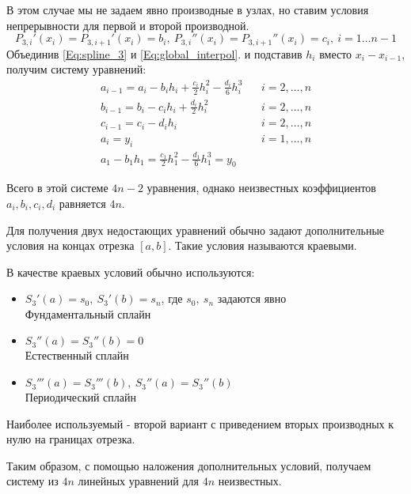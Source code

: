 
В этом случае мы не задаем явно производные в узлах, но ставим условия непрерывности для первой и второй производной.
\begin{equation}
    P_{3,i}' (x_i)=P_{3,i+1}' (x_i) = b_i,\  P_{3,i}'' (x_i )=P_{3,i+1}'' (x_i) = c_i, \ i=1\dots n-1
    \label{Eq:global_interpol}
\end{equation}
Объединив \eqref{Eq:spline_3} и \eqref{Eq:global_interpol}. и подставив $h_i$ вместо $x_i - x_{i-1}$, получим систему уравнений:
\begingroup
\Large
\begin{equation}
\begin{array}{lr}
     a_{i-1} = a_i - b_i h_i +\frac{c_i}{2}h_i^2 - \frac{d_i}{6}h_i^3\ \ \ \  & i = 2,\dots, n  \\
     b_{i-1} = b_i - c_i h_i +\frac{d_i}{2}h_i^2 & i = 2,\dots, n  \\
     c_{i-1} = c_i - d_i h_i & i = 2,\dots, n  \\
     a_i = y_i & i = 1,\dots, n \\
     a_1 - b_1 h_1 = \frac{c_1}{2} h_1^2 - \frac{d_1}{6} h_1^3 = y_0 &
\end{array}
\label{Sys:step0}
\end{equation}
\endgroup

Всего в этой системе $4n - 2$ уравнения, однако неизвестных коэффициентов $a_i,b_i,c_i,d_i$ равняется $4n$.

Для получения двух недостающих уравнений обычно задают дополнительные условия на концах отрезка $[a,b]$. Такие условия называются краевыми.

В качестве краевых условий обычно используются:
\begin{itemize}
    \item  $S_3'(a) = s_0,\  S_3'(b) = s_n$, где $s_0,\ s_n$ задаются явно \\
    Фундаментальный сплайн
    \item $S_3''(a) = S_3''(b) = 0$ \\
    Естественный сплайн
    \item $S_3'''(a) = S_3'''(b),\ S_3''(a) = S_3''(b)$ \\
    Периодический сплайн
\end{itemize}

Наиболее используемый - второй вариант с приведением вторых производных к нулю на границах отрезка.

Таким образом, с помощью наложения дополнительных условий, получаем систему из $4n$ линейных уравнений для $4n$ неизвестных.